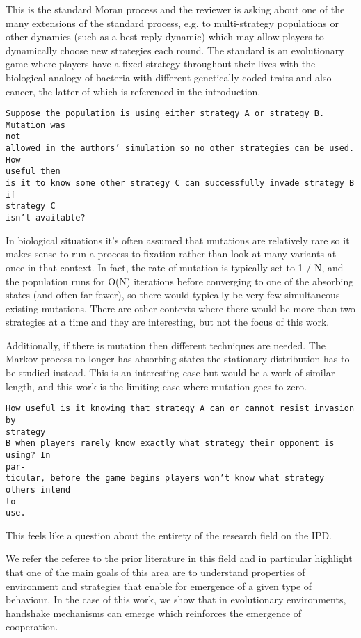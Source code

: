 \documentclass[a4]{article}
\begin{document}
This is the standard Moran process and the reviewer is asking about one of
the many extensions of the standard process, e.g. to multi-strategy populations
or other dynamics (such as a best-reply dynamic) which may allow players to
dynamically choose new strategies each round. The standard is an evolutionary
game where players have a fixed strategy throughout their lives with the
biological analogy of bacteria with different genetically coded traits and also
cancer, the latter of which is referenced in the introduction.

\begin{verbatim}
Suppose the population is using either strategy A or strategy B. Mutation was
not
allowed in the authors’ simulation so no other strategies can be used. How
useful then
is it to know some other strategy C can successfully invade strategy B if
strategy C
isn’t available?
\end{verbatim}

In biological situations it's often assumed that mutations are relatively rare
so it makes sense to run a process to fixation rather than look at many variants
at once in that context. In fact, the rate of mutation is typically set to 1 /
N, and the population runs for O(N) iterations before converging to one of the
absorbing states (and often far fewer), so there would typically be very few
simultaneous existing mutations. There are other contexts where there would be
more than two strategies at a time and they are interesting, but not the focus
of this work.

Additionally, if there is mutation then different techniques are needed. The
Markov process no longer has absorbing states the stationary distribution has 
to be studied instead. This is an interesting case but would be a
work of similar length, and this work is the limiting case where mutation goes
to zero.

\begin{verbatim}
How useful is it knowing that strategy A can or cannot resist invasion by
strategy
B when players rarely know exactly what strategy their opponent is using? In
par-
ticular, before the game begins players won’t know what strategy others intend
to
use.
\end{verbatim}

This feels like a question about the entirety of the research field on the IPD.

We refer the referee to the prior literature in this field and in
particular highlight that one of the main goals of this area are to understand
properties of environment and strategies that enable for emergence of a given
type of behaviour. In the case of this work, we show that in evolutionary
environments, handshake mechanisms can emerge which reinforces the emergence
of cooperation.
\end{document}
